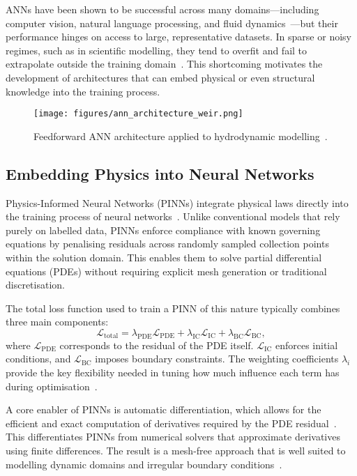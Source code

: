 \documentclass[12pt,a4paper]{article}
\begin{document}
ANNs have been shown to be successful across many domains—including computer vision, natural language processing, and fluid dynamics~\cite{ali2021prediction}—but their performance hinges on access to large, representative datasets. In sparse or noisy regimes, such as in scientific modelling, they tend to overfit and fail to extrapolate outside the training domain~\cite{lecun2015deep}. This shortcoming motivates the development of architectures that can embed physical or even structural knowledge into the training process.

\begin{figure}[h!]
  \centering
  \texttt{[image: figures/ann\_architecture\_weir.png]}
  \caption{Feedforward ANN architecture applied to hydrodynamic modelling~\cite{ali2021prediction}.}
  \label{fig:ann_architecture}
\end{figure}

\subsection{Embedding Physics into Neural Networks}

Physics-Informed Neural Networks (PINNs) integrate physical laws directly into the training process of neural networks~\cite{raissi2019physics}. Unlike conventional models that rely purely on labelled data, PINNs enforce compliance with known governing equations by penalising residuals across randomly sampled collection points within the solution domain. This enables them to solve partial differential equations (PDEs) without requiring explicit mesh generation or traditional discretisation.

The total loss function used to train a PINN of this nature typically combines three main components:
\begin{equation}
\mathcal{L}_{\text{total}} = \lambda_{\text{PDE}} \mathcal{L}_{\text{PDE}} + \lambda_{\text{IC}} \mathcal{L}_{\text{IC}} + \lambda_{\text{BC}} \mathcal{L}_{\text{BC}},
\label{eq:total-loss}
\end{equation}
where \(\mathcal{L}_{\text{PDE}}\) corresponds to the residual of the PDE itself. \(\mathcal{L}_{\text{IC}}\) enforces initial conditions, and \(\mathcal{L}_{\text{BC}}\) imposes boundary constraints. The weighting coefficients \(\lambda_i\) provide the key flexibility needed in tuning how much influence each term has during optimisation~\cite{mishra2022estimates}.

A core enabler of PINNs is automatic differentiation, which allows for the efficient and exact computation of derivatives required by the PDE residual~\cite{baydin2018automatic}. This differentiates PINNs from numerical solvers that approximate derivatives using finite differences. The result is a mesh-free approach that is well suited to modelling dynamic domains and irregular boundary conditions~\cite{karniadakis2021physics}.
\end{document}
